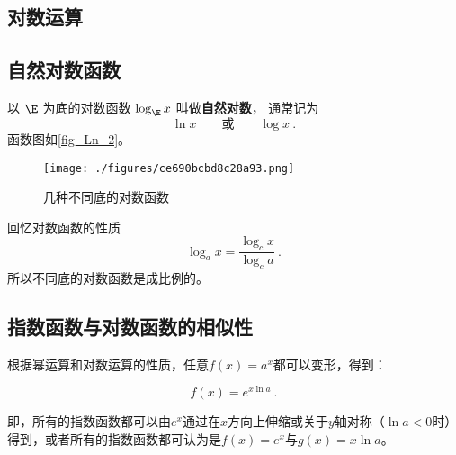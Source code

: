 \begin{issues}
\issueDraft
\end{issues}

\subsection{对数运算}


\subsection{自然对数函数}
以 $\E$ 为底的对数函数 $\log_{\E} x$ 叫做\textbf{自然对数}， 通常记为
\begin{equation}
\ln x \qquad \text{或} \qquad \log x~.
\end{equation}
函数图如\autoref{fig_Ln_2}。
\begin{figure}[ht]
\centering
\texttt{[image: ./figures/ce690bcbd8c28a93.png]}
\caption{几种不同底的对数函数} \label{fig_Ln_2}
\end{figure}
回忆对数函数的性质
\begin{equation}
\log_a x = \frac{\log_c x}{\log_c a}~.
\end{equation}
所以不同底的对数函数是成比例的。



\subsection{指数函数与对数函数的相似性}

根据幂运算和对数运算的性质，任意$f(x)=a^x$都可以变形，得到：

\begin{equation}
f(x)=e^{x\ln a}~.
\end{equation}

即，所有的指数函数都可以由$e^x$通过在$x$方向上伸缩或关于$y$轴对称（$\ln a<0$时）得到，或者所有的指数函数都可认为是$f(x)=e^x$与$g(x)=x\ln a$。